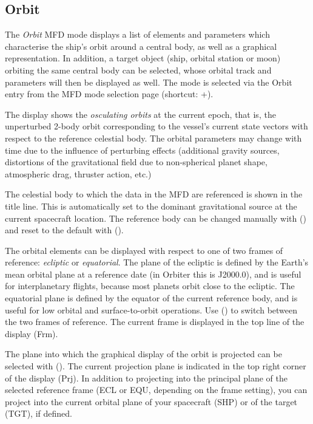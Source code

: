 \documentclass[Orbiter User Manual.tex]{subfiles}
\begin{document}
\subsection{Orbit}
\label{ssec:mfd_orbit}
The \emph{Orbit} MFD mode displays a list of elements and parameters which
characterise the ship's orbit around a central body, as well as a graphical
representation. In addition, a target object (ship, orbital station or moon)
orbiting the same central body can be selected, whose orbital track and
parameters will then be displayed as well. The mode is selected via the Orbit
entry from the MFD mode selection page (shortcut: +).

The display shows the \emph{osculating orbits} at the current epoch, that is,
the unperturbed 2-body orbit corresponding to the vessel's current state vectors
with respect to the reference celestial body. The orbital parameters may change
with time due to the influence of perturbing effects (additional gravity
sources, distortions of the gravitational field due to non-spherical planet
shape, atmospheric drag, thruster action, etc.)

The celestial body to which the data in the MFD are referenced is shown in the
title line. This is automatically set to the dominant gravitational source at
the current spacecraft location. The reference body can be changed manually with
 () and reset to the default with 
().

The orbital elements can be displayed with respect to one of two frames of
reference: \emph{ecliptic} or \emph{equatorial}. The plane of the ecliptic is
defined by the Earth's mean orbital plane at a reference date (in Orbiter this
is J2000.0), and is useful for interplanetary flights, because most planets
orbit close to the ecliptic. The equatorial plane is defined by the equator of
the current reference body, and is useful for low orbital and surface-to-orbit
operations. Use  () to switch between the two frames of
reference. The current frame is displayed in the top line of the display (Frm).

The plane into which the graphical display of the orbit is projected can be
selected with  (). The current projection plane is
indicated in the top right corner of the display (Prj). In addition to
projecting into the principal plane of the selected reference frame (ECL or EQU,
depending on the frame setting), you can project into the current orbital plane
of your spacecraft (SHP) or of the target (TGT), if defined.
\end{document}
